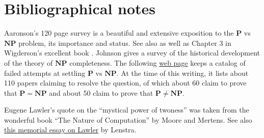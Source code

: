 \hypertarget{balancedmc}{}

\hypertarget{manyregs}{}

\section{Bibliographical notes}\label{Bibliographical-notes}

Aaronson's 120 page survey \cite{aaronson2016p} is a beautiful and
extensive exposition to the \(\mathbf{P}\) vs \(\mathbf{NP}\) problem,
its importance and status. See also as well as Chapter 3 in Wigderson's
excellent book \cite{wigderson2017mathematics}. Johnson
\cite{johnson2012brief} gives a survey of the historical development of
the theory of \(\mathbf{NP}\) completeness. The following
\href{https://goo.gl/bFHsd9}{web page} keeps a catalog of failed
attempts at settling \(\mathbf{P}\) vs \(\mathbf{NP}\). At the time of
this writing, it lists about 110 papers claiming to resolve the
question, of which about 60 claim to prove that
\(\mathbf{P}=\mathbf{NP}\) and about 50 claim to prove that
\(\mathbf{P} \neq \mathbf{NP}\).

Eugene Lawler's quote on the ``mystical power of twoness'' was taken
from the wonderful book ``The Nature of Computation'' by Moore and
Mertens. See also
\href{https://pure.tue.nl/ws/files/1506049/511307.pdf}{this memorial
essay on Lawler} by Lenstra.
